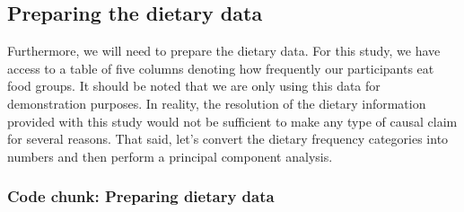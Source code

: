 \documentclass[
]{article}
\newenvironment{Shaded}{\begin{snugshade}}{\end{snugshade}}
\newcommand{\CommentTok}[1]{\textcolor[rgb]{0.56,0.35,0.01}{\textit{#1}}}
\newcommand{\DecValTok}[1]{\textcolor[rgb]{0.00,0.00,0.81}{#1}}
\newcommand{\FunctionTok}[1]{\textcolor[rgb]{0.00,0.00,0.00}{#1}}
\newcommand{\NormalTok}[1]{#1}
\newcommand{\OtherTok}[1]{\textcolor[rgb]{0.56,0.35,0.01}{#1}}
\newcommand{\SpecialCharTok}[1]{\textcolor[rgb]{0.00,0.00,0.00}{#1}}
\newcommand{\StringTok}[1]{\textcolor[rgb]{0.31,0.60,0.02}{#1}}
\begin{document}
\hypertarget{preparing-the-dietary-data}{%
\subsection{Preparing the dietary
data}\label{preparing-the-dietary-data}}

Furthermore, we will need to prepare the dietary data. For this study,
we have access to a table of five columns denoting how frequently our
participants eat food groups. It should be noted that we are only using
this data for demonstration purposes. In reality, the resolution of the
dietary information provided with this study would not be sufficient to
make any type of causal claim for several reasons. That said, let's
convert the dietary frequency categories into numbers and then perform a
principal component analysis.

\hypertarget{code-chunk-preparing-dietary-data}{%
\subsubsection{Code chunk: Preparing dietary
data}\label{code-chunk-preparing-dietary-data}}

\begin{Shaded}
\end{Shaded}
\end{document}
